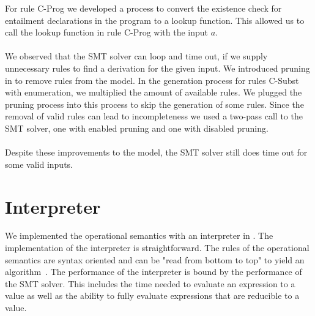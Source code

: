 For rule C-Prog we developed a process to convert the existence check for
entailment declarations in the program to a lookup function.
This allowed us to call the lookup function in rule C-Prog with the input $a$.\\
\\
We observed that the SMT solver can loop and time out,
if we supply unnecessary rules to find a derivation
for the given input.
We introduced pruning in  to
remove rules from the model.
In the generation process for rules C-Subst with enumeration,
we multiplied the amount of available rules.
We plugged the pruning process into this process
to skip the generation of some rules.
Since the removal of valid rules can lead to incompleteness
we used a two-pass call to the SMT solver,
one with enabled pruning and one with disabled pruning.\\
\\
Despite these improvements to the model,
the SMT solver still does time out
for some valid inputs.
%

\section{Interpreter}
We implemented the operational semantics with an interpreter in .
The implementation of the interpreter is straightforward.
The rules of the operational semantics are syntax oriented
and can be "read from bottom to top" to yield
an algorithm~\cite{tpl}.
The performance of the interpreter is bound
by the performance of the SMT solver.
This includes the time needed to evaluate an expression to a value
as well as the ability to fully evaluate expressions
that are reducible to a value.
%

